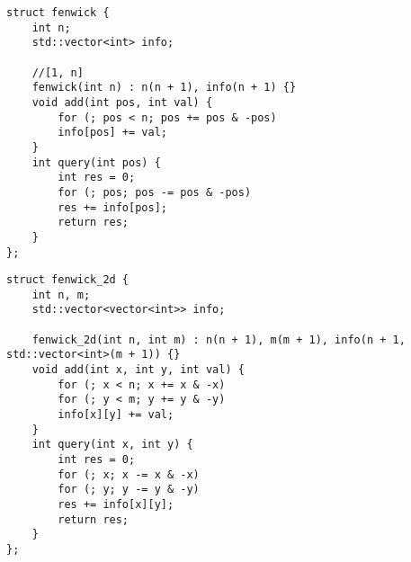 \begin{lstlisting}
struct fenwick {
	int n;
	std::vector<int> info;
	
	//[1, n]
	fenwick(int n) : n(n + 1), info(n + 1) {}
	void add(int pos, int val) {
		for (; pos < n; pos += pos & -pos)
		info[pos] += val;
	}
	int query(int pos) {
		int res = 0;
		for (; pos; pos -= pos & -pos)
		res += info[pos];
		return res;
	}
};
\end{lstlisting}
\begin{lstlisting}
struct fenwick_2d {
	int n, m;
	std::vector<vector<int>> info;
	
	fenwick_2d(int n, int m) : n(n + 1), m(m + 1), info(n + 1, std::vector<int>(m + 1)) {}
	void add(int x, int y, int val) {
		for (; x < n; x += x & -x)
		for (; y < m; y += y & -y)
		info[x][y] += val;
	}
	int query(int x, int y) {
		int res = 0;
		for (; x; x -= x & -x)
		for (; y; y -= y & -y)
		res += info[x][y];
		return res;
	}
};
\end{lstlisting}